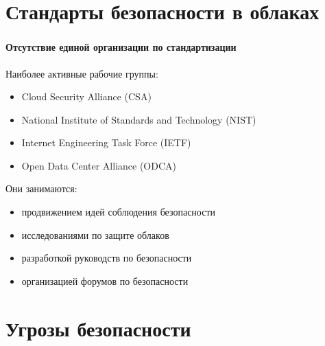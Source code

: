 
\frame[plain]{\titlepage} %


\section{Стандарты безопасности в облаках}

\begin{frame}
\frametitle{\insertsection}
\framesubtitle{Отсутствие единой организации по стандартизации}

Наиболее активные рабочие группы:
\begin{itemize}
    \item Cloud Security Alliance (CSA)
    \item National Institute of Standards and Technology (NIST)
    \item Internet Engineering Task Force (IETF)
    \item Open Data Center Alliance (ODCA)
\end{itemize}

\vspace{\baselineskip}

Они занимаются:
\begin{itemize}
    \item продвижением идей соблюдения безопасности
    \item исследованиями по защите облаков
    \item разработкой руководств по безопасности
    \item организацией форумов по безопасности
\end{itemize}
\end{frame}


\section{Угрозы безопасности}

